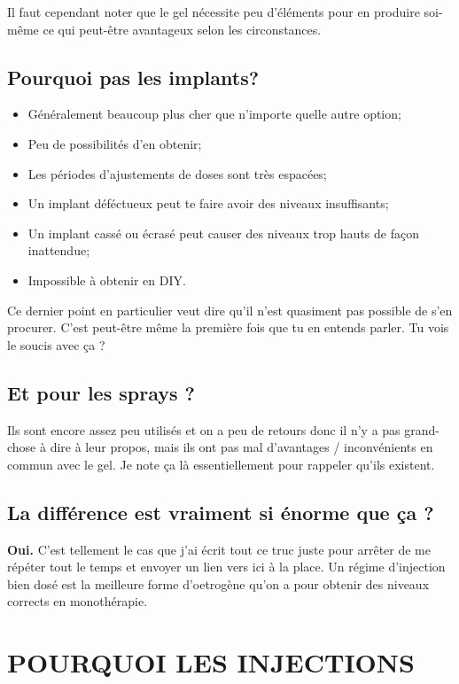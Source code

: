 \documentclass{article}
\begin{document}
Il faut cependant noter que le gel nécessite peu d'éléments pour en produire soi-même ce qui peut-être avantageux selon les circonstances.

\subsection{Pourquoi pas les implants?}

\begin{itemize}
  \item Généralement beaucoup plus cher que n'importe quelle autre option;
  \item Peu de possibilités d'en obtenir;
  \item Les périodes d'ajustements de doses sont très espacées;
  \item Un implant déféctueux peut te faire avoir des niveaux insuffisants;
  \item Un implant cassé ou écrasé peut causer des niveaux trop hauts de façon inattendue;
  \item Impossible à obtenir en DIY.
\end{itemize}

Ce dernier point en particulier veut dire qu'il n'est quasiment pas possible de s'en procurer. C'est peut-être même la première fois que tu en entends parler. Tu vois le soucis avec ça ?

\subsection{Et pour les sprays ?}

Ils sont encore assez peu utilisés et on a peu de retours donc il n'y a pas grand-chose à dire à leur propos, mais ils ont pas mal d'avantages / inconvénients en commun avec le gel. Je note ça là essentiellement pour rappeler qu'ils existent.

\subsection{La différence est vraiment si énorme que ça ?}

\textbf{Oui.} C'est tellement le cas que j'ai écrit tout ce truc juste pour arrêter de me répéter tout le temps et envoyer un lien vers ici à la place. Un régime d'injection bien dosé est la meilleure forme d'oetrogène qu'on a pour obtenir des niveaux corrects en monothérapie.

 

\section{POURQUOI LES INJECTIONS}
\end{document}

